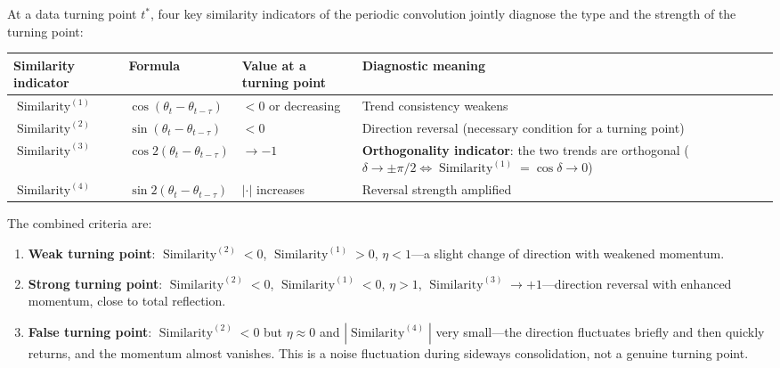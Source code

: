 \begin{proposition}\label{prop:inflection_periodic_transform}
At a data turning point $t^*$, four key similarity indicators of the periodic convolution jointly diagnose the type and the strength of the turning point:
\begin{center}
\begin{tabular}{>{\centering\arraybackslash}p{2.7cm}>{\centering\arraybackslash}p{3.2cm}>{\centering\arraybackslash}p{3.0cm}>{\centering\arraybackslash}p{4.6cm}}
\toprule
Similarity indicator & Formula & Value at a turning point & Diagnostic meaning \\
\midrule
$\operatorname{Similarity}^{(1)}$ & $\cos(\theta_t - \theta_{t-\tau})$ & $< 0$ or decreasing & Trend consistency weakens \\
$\operatorname{Similarity}^{(2)}$ & $\sin(\theta_t - \theta_{t-\tau})$ & $< 0$ & Direction reversal (necessary condition for a turning point) \\
$\operatorname{Similarity}^{(3)}$ & $\cos 2(\theta_t - \theta_{t-\tau})$ & $\to -1$ & \textbf{Orthogonality indicator}: the two trends are orthogonal ($\delta\to\pm\pi/2\iff\operatorname{Similarity}^{(1)}=\cos\delta\to0$) \\
$\operatorname{Similarity}^{(4)}$ & $\sin 2(\theta_t - \theta_{t-\tau})$ & $|\cdot|$ increases & Reversal strength amplified \\
\bottomrule
\end{tabular}
\end{center}
The combined criteria are:
\begin{enumerate}[label=(\roman*)]
    \item \textbf{Weak turning point}: $\operatorname{Similarity}^{(2)} < 0$, $\operatorname{Similarity}^{(1)} > 0$, $\eta < 1$---a slight change of direction with weakened momentum.
    \item \textbf{Strong turning point}: $\operatorname{Similarity}^{(2)} < 0$, $\operatorname{Similarity}^{(1)} < 0$, $\eta > 1$, $\operatorname{Similarity}^{(3)} \to +1$---direction reversal with enhanced momentum, close to total reflection.
    \item \textbf{False turning point}: $\operatorname{Similarity}^{(2)} < 0$ but $\eta \approx 0$ and $|\operatorname{Similarity}^{(4)}|$ very small---the direction fluctuates briefly and then quickly returns, and the momentum almost vanishes. This is a noise fluctuation during sideways consolidation, not a genuine turning point.
\end{enumerate}
\end{proposition}

